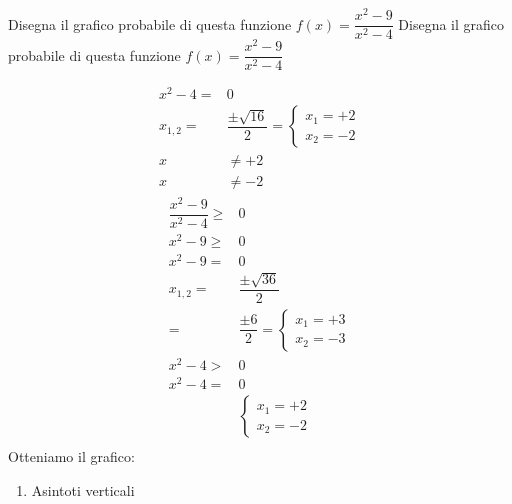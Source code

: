 \begin{exercise}
	Disegna il grafico probabile di questa funzione $f(x)= \dfrac{x^2-9}{x^2-4}$
	\tcblower
	Disegna il grafico probabile di questa funzione $f(x)= \dfrac{x^2-9}{x^2-4}$
	\begin{itemize}
	\begin{align*}
x^2-4=&0\\
x_{1,2}=&\dfrac{\pm\sqrt{16}}{2}
=\begin{cases}
x_1=+2\\
x_2=-2
\end{cases}\\
x&\neq+2\\
x&\neq-2
\end{align*}
		\begin{align*}
	\dfrac{x^2-9}{x^2-4}\geq&0\\
	x^2-9\geq&0\\
	x^2-9=&0\\
	x_{1,2}=&\dfrac{\pm\sqrt{36}}{2}\\
	=&\dfrac{\pm 6}{2}
	=\begin{cases}
	x_1=+3\\
	x_2=-3
	\end{cases}\\
	x^2-4>&0\\
	x^2-4=&0\\
	&\begin{cases}
	x_1=+2\\
	x_2=-2
	\end{cases}\\
	\end{align*}
	Otteniamo il grafico:
	\begin{center}
		
	\end{center}
	\begin{enumerate}
		\item Asintoti verticali
		

\end{enumerate}
\end{itemize}
\end{exercise}
